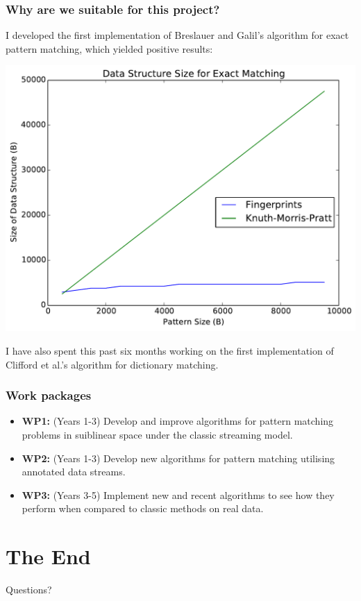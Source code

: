 \documentclass{beamer}
\begin{document}
\begin{frame}
\frametitle{Why are we suitable for this project?}
I developed the first implementation of Breslauer and Galil's algorithm for exact pattern matching, which yielded positive results:

\begin{center}
\includegraphics[width=0.5\paperwidth]{exact_size}
\end{center}

I have also spent this past six months working on the first implementation of Clifford et al.'s algorithm for dictionary matching.
\end{frame}


\begin{frame}
\frametitle{Work packages}
\begin{itemize}
\item\textbf{WP1:} (Years 1-3) Develop and improve algorithms for pattern matching problems in suiblinear space under the classic streaming model.
\item\textbf{WP2:} (Years 1-3) Develop new algorithms for pattern matching utilising annotated data streams.
\item\textbf{WP3:} (Years 3-5) Implement new and recent algorithms to see how they perform when compared to classic methods on real data.
\end{itemize}
\end{frame}

\section{The End}

\begin{frame}
\Huge{\centerline{Questions?}}
\end{frame}

\end{document}
